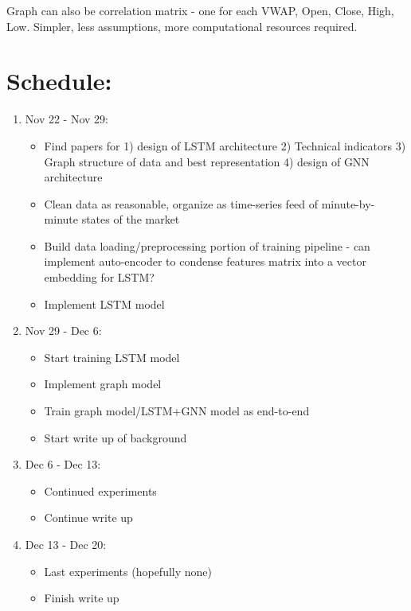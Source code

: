 \documentclass[12pt]{article}
\begin{document}
Graph can also be correlation matrix - one for each VWAP, Open, Close, High, Low. Simpler, less assumptions, more computational resources required.

\newpage

\section*{Schedule:}

\begin{enumerate}
  \item Nov 22 - Nov 29:
    \begin{itemize}
      \item Find papers for 1) design of LSTM architecture 2) Technical indicators 3) Graph structure of data and best representation 4) design of GNN architecture
      \item Clean data as reasonable, organize as time-series feed of minute-by-minute states of the market
      \item Build data loading/preprocessing portion of training pipeline - can implement auto-encoder to condense features matrix into a vector embedding for LSTM?
      \item Implement LSTM model
    \end{itemize}
  \item Nov 29 - Dec 6:
    \begin{itemize}
      \item Start training LSTM model
      \item Implement graph model
      \item Train graph model/LSTM+GNN model as end-to-end
      \item Start write up of background
    \end{itemize}
  \item Dec 6 - Dec 13:
    \begin{itemize}
      \item Continued experiments
      \item Continue write up
    \end{itemize}
  \item Dec 13 - Dec 20: 
    \begin{itemize}
      \item Last experiments (hopefully none)
      \item Finish write up
    \end{itemize}
\end{enumerate}
\end{document}
